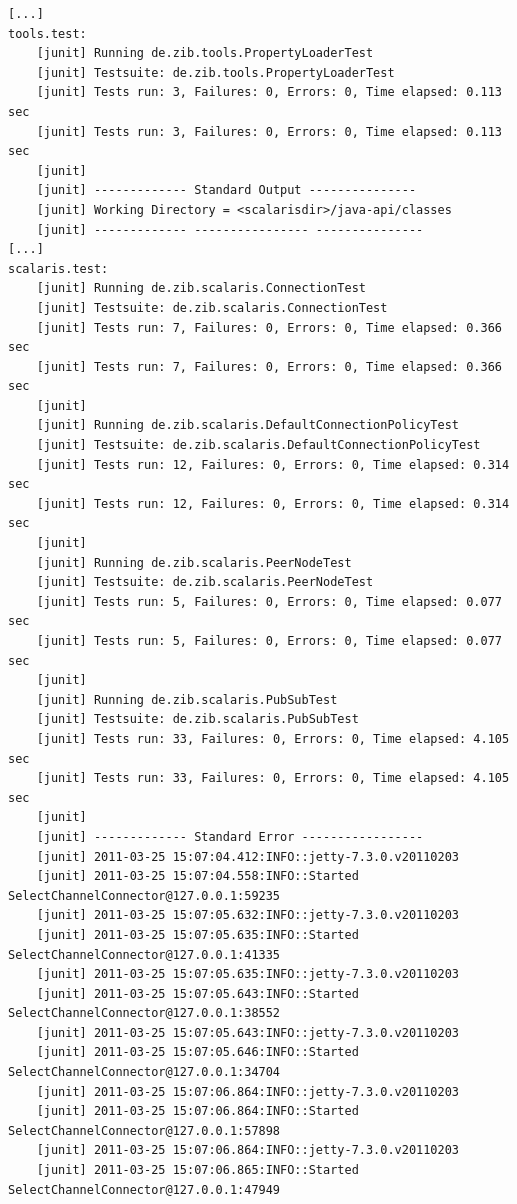 \documentclass[a4paper]{scrreprt}
\begin{document}
\begin{lstlisting}[language={}]
%> make java-test
[...]
tools.test:
    [junit] Running de.zib.tools.PropertyLoaderTest
    [junit] Testsuite: de.zib.tools.PropertyLoaderTest
    [junit] Tests run: 3, Failures: 0, Errors: 0, Time elapsed: 0.113 sec
    [junit] Tests run: 3, Failures: 0, Errors: 0, Time elapsed: 0.113 sec
    [junit] 
    [junit] ------------- Standard Output ---------------
    [junit] Working Directory = <scalarisdir>/java-api/classes
    [junit] ------------- ---------------- ---------------
[...]
scalaris.test:
    [junit] Running de.zib.scalaris.ConnectionTest
    [junit] Testsuite: de.zib.scalaris.ConnectionTest
    [junit] Tests run: 7, Failures: 0, Errors: 0, Time elapsed: 0.366 sec
    [junit] Tests run: 7, Failures: 0, Errors: 0, Time elapsed: 0.366 sec
    [junit] 
    [junit] Running de.zib.scalaris.DefaultConnectionPolicyTest
    [junit] Testsuite: de.zib.scalaris.DefaultConnectionPolicyTest
    [junit] Tests run: 12, Failures: 0, Errors: 0, Time elapsed: 0.314 sec
    [junit] Tests run: 12, Failures: 0, Errors: 0, Time elapsed: 0.314 sec
    [junit] 
    [junit] Running de.zib.scalaris.PeerNodeTest
    [junit] Testsuite: de.zib.scalaris.PeerNodeTest
    [junit] Tests run: 5, Failures: 0, Errors: 0, Time elapsed: 0.077 sec
    [junit] Tests run: 5, Failures: 0, Errors: 0, Time elapsed: 0.077 sec
    [junit] 
    [junit] Running de.zib.scalaris.PubSubTest
    [junit] Testsuite: de.zib.scalaris.PubSubTest
    [junit] Tests run: 33, Failures: 0, Errors: 0, Time elapsed: 4.105 sec
    [junit] Tests run: 33, Failures: 0, Errors: 0, Time elapsed: 4.105 sec
    [junit] 
    [junit] ------------- Standard Error -----------------
    [junit] 2011-03-25 15:07:04.412:INFO::jetty-7.3.0.v20110203
    [junit] 2011-03-25 15:07:04.558:INFO::Started SelectChannelConnector@127.0.0.1:59235
    [junit] 2011-03-25 15:07:05.632:INFO::jetty-7.3.0.v20110203
    [junit] 2011-03-25 15:07:05.635:INFO::Started SelectChannelConnector@127.0.0.1:41335
    [junit] 2011-03-25 15:07:05.635:INFO::jetty-7.3.0.v20110203
    [junit] 2011-03-25 15:07:05.643:INFO::Started SelectChannelConnector@127.0.0.1:38552
    [junit] 2011-03-25 15:07:05.643:INFO::jetty-7.3.0.v20110203
    [junit] 2011-03-25 15:07:05.646:INFO::Started SelectChannelConnector@127.0.0.1:34704
    [junit] 2011-03-25 15:07:06.864:INFO::jetty-7.3.0.v20110203
    [junit] 2011-03-25 15:07:06.864:INFO::Started SelectChannelConnector@127.0.0.1:57898
    [junit] 2011-03-25 15:07:06.864:INFO::jetty-7.3.0.v20110203
    [junit] 2011-03-25 15:07:06.865:INFO::Started SelectChannelConnector@127.0.0.1:47949

\end{lstlisting}
\end{document}
